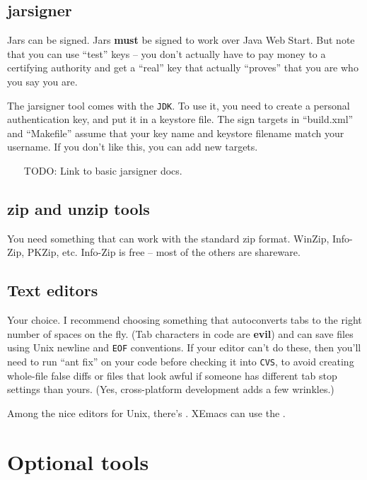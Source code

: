 \documentclass{article}
\begin{document}
\subsection{jarsigner}

Jars can be signed. Jars \textbf{must} be signed to work over Java Web Start.
But note that you can use ``test'' keys -- you don't actually have to
pay money to a certifying authority and get a ``real'' key that actually
``proves'' that you are who you say you are.

The jarsigner tool comes with the \texttt{JDK}. To use it, you need to create
a personal authentication key, and put it in a keystore file. The sign
targets in ``build.xml'' and ``Makefile'' assume that your key name and
keystore filename match your username. If you don't like this, you can
add new targets.

\begin{itemize}
\item[TODO:] Link to basic jarsigner docs.
\end{itemize}

\subsection{zip and unzip tools}

You need something that can work with the standard zip format. WinZip, 
Info-Zip, PKZip, etc. Info-Zip is free -- most of the others are
shareware. 

\subsection{Text editors}

Your choice. I recommend choosing something that autoconverts tabs to
the right number of spaces on the fly. (Tab characters in code are
\textbf{evil}) and can save files using Unix newline and \texttt{EOF}
conventions. If your editor can't do these, then you'll need to run
``ant fix'' on your code before checking it into \texttt{CVS}, to avoid
creating whole-file false diffs or files that look awful if someone has
different tab stop settings than yours. (Yes, cross-platform development
adds a few wrinkles.)

Among the nice editors for Unix, there's . XEmacs can use the
.

\section{Optional tools}
\end{document}
